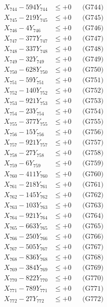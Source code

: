 \documentclass[a4paper,10pt]{article}
\begin{document}
{\begin{align}
X_{744} - 594Y_{744} &\leq +0 && \text{(G744)} \\
X_{745} - 219Y_{745} &\leq +0 && \text{(G745)} \\
X_{746} - 4Y_{746} &\leq +0 && \text{(G746)} \\
X_{747} - 377Y_{747} &\leq +0 && \text{(G747)} \\
X_{748} - 337Y_{748} &\leq +0 && \text{(G748)} \\
X_{749} - 32Y_{749} &\leq +0 && \text{(G749)} \\
X_{750} - 628Y_{750} &\leq +0 && \text{(G750)} \\
\allowbreak
X_{751} - 59Y_{751} &\leq +0 && \text{(G751)} \\
X_{752} - 140Y_{752} &\leq +0 && \text{(G752)} \\
X_{753} - 921Y_{753} &\leq +0 && \text{(G753)} \\
X_{754} - 23Y_{754} &\leq +0 && \text{(G754)} \\
X_{755} - 377Y_{755} &\leq +0 && \text{(G755)} \\
X_{756} - 15Y_{756} &\leq +0 && \text{(G756)} \\
X_{757} - 921Y_{757} &\leq +0 && \text{(G757)} \\
X_{758} - 27Y_{758} &\leq +0 && \text{(G758)} \\
X_{759} - 6Y_{759} &\leq +0 && \text{(G759)} \\
X_{760} - 411Y_{760} &\leq +0 && \text{(G760)} \\
\allowbreak
X_{761} - 218Y_{761} &\leq +0 && \text{(G761)} \\
X_{762} - 145Y_{762} &\leq +0 && \text{(G762)} \\
X_{763} - 103Y_{763} &\leq +0 && \text{(G763)} \\
X_{764} - 921Y_{764} &\leq +0 && \text{(G764)} \\
X_{765} - 663Y_{765} &\leq +0 && \text{(G765)} \\
X_{766} - 250Y_{766} &\leq +0 && \text{(G766)} \\
X_{767} - 505Y_{767} &\leq +0 && \text{(G767)} \\
X_{768} - 836Y_{768} &\leq +0 && \text{(G768)} \\
X_{769} - 384Y_{769} &\leq +0 && \text{(G769)} \\
X_{770} - 822Y_{770} &\leq +0 && \text{(G770)} \\
\allowbreak
X_{771} - 789Y_{771} &\leq +0 && \text{(G771)} \\
X_{772} - 27Y_{772} &\leq +0 && \text{(G772)} \\

\end{align}}
\end{document}
